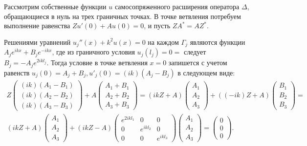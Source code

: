 Рассмотрим собственные функции $u$ самосопряженного расширения оператора $\Delta$, обращающиеся в нуль на трех граничных точках. В точке ветвления потребуем выполнение равенства $Z u'(0) + A u(0) =0$, и пусть $Z A^* = A Z^*$.

Решениями уравнений $u_j''(x) +k^2 u(x) = 0$ на каждом $\Gamma_j$ являются функции $A_j e^{ i  k x} + B_j  e^{ -i  k x}$, где из граничного условия $u_j(l_j)=0 = $ следует $B_j = -A_j e^{ 2 i  k l_j}$.
Тогда условие в точке ветвления $x=0$ запишется с учетом равенств $u_j(0) = A_j + B_j, u'_j(0) = (i k) (A_j-B_j)$ в следующем виде:
\begin{multline*}
Z \begin{pmatrix}
(i k) (A_1-B_1) \\ (i k) (A_2-B_2) \\ (i k) (A_3-B_3)
\end{pmatrix}
+A \begin{pmatrix}
A_1+B_1 \\ A_2+B_2 \\ A_3+B_3
\end{pmatrix}
= 
(i k Z + A) \begin{pmatrix}
 A_1 \\  A_2 \\  A_3
\end{pmatrix}+ ((-i k) Z + A) 
\begin{pmatrix}
B_1 \\ B_2  \\ B_3
\end{pmatrix}
 = \\ 
\left(
i k Z + A 
\right)
\begin{pmatrix}
 A_1 \\  A_2 \\  A_3
\end{pmatrix} + 
(i k Z - A )
\begin{pmatrix}
e^{ 2i  k l_1} 	& 0 			& 0 \\ 
0 		& e^{ i  k l_2}  	& 0 \\ 
0		& 0			& e^{ i  k l_3}
\end{pmatrix}
\begin{pmatrix}
 A_1 \\  A_2 \\  A_3
\end{pmatrix} = \begin{pmatrix}
0  \\ 0 \\ 0 
\end{pmatrix}.
\end{multline*}
